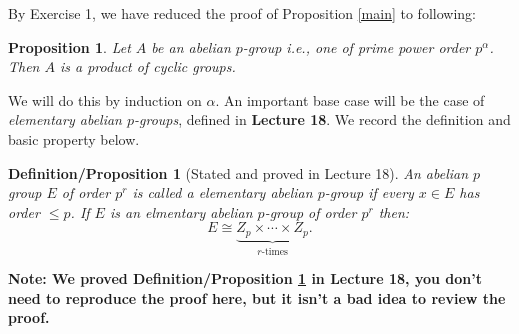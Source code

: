 \documentclass[11pt]{article}
\newtheorem{proposition}[theorem]{Proposition}
\newtheorem{defProp}[theorem]{Definition/Proposition}
\begin{document}
By Exercise 1, we have reduced the proof of Proposition \ref{main} to following:
\begin{proposition}\label{pmain}
   Let $A$ be an abelian $p$-group i.e., one of prime power order $p^\alpha$.  Then $A$ is a product of cyclic groups.
\end{proposition}
We will do this by induction on $\alpha$.  An important base case will be the case of \textit{elementary abelian $p$-groups}, defined in \textbf{Lecture 18}.  We record the definition and basic property below.
\begin{defProp}[Stated and proved in Lecture 18]\label{elementary}
  An abelian $p$ group $E$ of order $p^r$ is called a \textit{elementary abelian $p$-group} if every $x\in E$ has order $\le p$.  If $E$ is an elmentary abelian $p$-group of order $p^r$ then:
  \[E\cong\underbrace{Z_p\times\cdots\times Z_p}_{r\text{-times}}.\]
\end{defProp}
\textbf{Note: We proved Definition/Proposition \ref{elementary} in Lecture 18, you don't need to reproduce the proof here, but it isn't a bad idea to review the proof.}
\newpage
\end{document}
